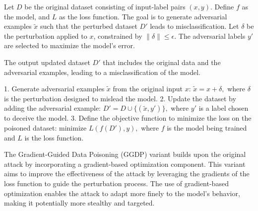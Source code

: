 Let \( D \) be the original dataset consisting of input-label pairs \( (x, y) \). Define \( f \) as the model, and \( L \) as the loss function. The goal is to generate adversarial examples \( \tilde{x} \) such that the perturbed dataset \( D' \) leads to misclassification. Let \( \delta \) be the perturbation applied to \( x \), constrained by \( \|\delta\| \leq \epsilon \). The adversarial labels \( y' \) are selected to maximize the model’s error.

The output updated dataset $D'$ that includes the original data and the adversarial examples, leading to a misclassification of the model.

1. Generate adversarial examples $\tilde{x}$ from the original input $x$:
   $
   \tilde{x} = x + \delta,
   $
   where $\delta$ is the perturbation designed to mislead the model.
2. Update the dataset by adding the adversarial example:
   $
   D' = D \cup \{(\tilde{x}, y')\},
   $
   where $y'$ is a label chosen to deceive the model.
3. Define the objective function to minimize the loss on the poisoned dataset:
   $
   \text{minimize } L(f(D'), y),
   $
   where $f$ is the model being trained and $L$ is the loss function.

The  Gradient-Guided Data Poisoning (GGDP) variant builds upon the original attack by incorporating a gradient-based optimization component. This variant aims to improve the effectiveness of the attack by leveraging the gradients of the loss function to guide the perturbation process. The use of gradient-based optimization enables the attack to adapt more finely to the model's behavior, making it potentially more stealthy and targeted.